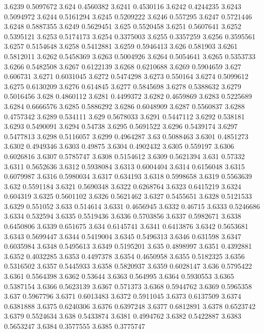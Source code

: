3.6239  0.5097672
3.624  0.4560382
3.6241  0.4530116
3.6242  0.4244235
3.6243  0.5094972
3.6244  0.5161294
3.6245  0.5209222
3.6246  0.557295
3.6247  0.5721446
3.6248  0.5887355
3.6249  0.5629451
3.625  0.5520458
3.6251  0.5607641
3.6252  0.5395121
3.6253  0.5174173
3.6254  0.3375003
3.6255  0.3357259
3.6256  0.3595561
3.6257  0.5154648
3.6258  0.5412881
3.6259  0.5946413
3.626  0.581903
3.6261  0.5812011
3.6262  0.5458369
3.6263  0.5004926
3.6264  0.5054641
3.6265  0.5353733
3.6266  0.5482508
3.6267  0.6122139
3.6268  0.6210688
3.6269  0.5904659
3.627  0.606731
3.6271  0.6031045
3.6272  0.5474298
3.6273  0.550164
3.6274  0.5099612
3.6275  0.6130209
3.6276  0.614845
3.6277  0.5845698
3.6278  0.5388632
3.6279  0.5016456
3.628  0.4860112
3.6281  0.4499372
3.6282  0.4659869
3.6283  0.5225689
3.6284  0.6666576
3.6285  0.5886292
3.6286  0.6048909
3.6287  0.5560837
3.6288  0.4757342
3.6289  0.534111
3.629  0.5678033
3.6291  0.5447112
3.6292  0.538181
3.6293  0.5490091
3.6294  0.54738
3.6295  0.5691522
3.6296  0.5439174
3.6297  0.5477813
3.6298  0.5116057
3.6299  0.4964287
3.63  0.5088463
3.6301  0.4851273
3.6302  0.4949346
3.6303  0.49875
3.6304  0.4902432
3.6305  0.559197
3.6306  0.6026816
3.6307  0.5785747
3.6308  0.5154612
3.6309  0.5621394
3.631  0.57332
3.6311  0.5652636
3.6312  0.5938084
3.6313  0.6004404
3.6314  0.6156048
3.6315  0.6079987
3.6316  0.5980034
3.6317  0.634193
3.6318  0.5998658
3.6319  0.5563639
3.632  0.5591184
3.6321  0.5690348
3.6322  0.6268764
3.6323  0.6415219
3.6324  0.604319
3.6325  0.5601102
3.6326  0.5621462
3.6327  0.5455651
3.6328  0.5121533
3.6329  0.551052
3.633  0.514614
3.6331  0.4656945
3.6332  0.46715
3.6333  0.5246686
3.6334  0.532594
3.6335  0.5519436
3.6336  0.5703856
3.6337  0.5982671
3.6338  0.6450806
3.6339  0.651675
3.634  0.6145741
3.6341  0.6413876
3.6342  0.5653681
3.6343  0.5699447
3.6344  0.5419004
3.6345  0.5496313
3.6346  0.631598
3.6347  0.6035984
3.6348  0.5495613
3.6349  0.5195201
3.635  0.4898997
3.6351  0.4392881
3.6352  0.4032285
3.6353  0.4497378
3.6354  0.4650958
3.6355  0.5182325
3.6356  0.5316502
3.6357  0.5445933
3.6358  0.5820937
3.6359  0.6028147
3.636  0.5795422
3.6361  0.5564398
3.6362  0.53644
3.6363  0.564995
3.6364  0.5930553
3.6365  0.5387154
3.6366  0.5623139
3.6367  0.571373
3.6368  0.5944762
3.6369  0.5965358
3.637  0.5967796
3.6371  0.6013483
3.6372  0.5911045
3.6373  0.6137509
3.6374  0.6381888
3.6375  0.6240306
3.6376  0.6397248
3.6377  0.6812891
3.6378  0.6523742
3.6379  0.5524634
3.638  0.5433874
3.6381  0.4994762
3.6382  0.5422887
3.6383  0.5653247
3.6384  0.3577555
3.6385  0.3775747
